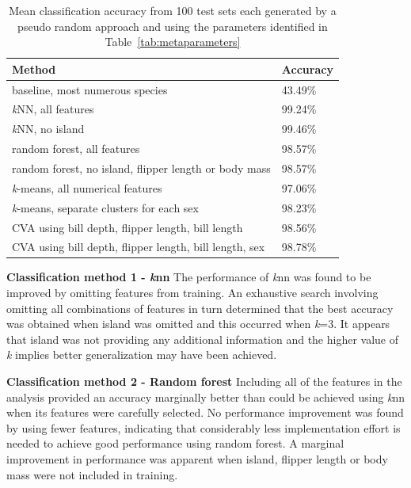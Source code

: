 \documentclass[12pt]{article}
\begin{document}
\begin{table} %
  \small
  \begin{center}
  \vspace{0\baselineskip} %
  \setlength{\abovecaptionskip}{5pt}
  \setlength{\belowcaptionskip}{5pt}
  \fontsize{10}{10}\selectfont %
  \begin{tabular}{l|l}
  Method & Accuracy\\
  \hline
  baseline, most numerous species & 43.49\% \\
  \hline
  \textit{k}NN, all features	& 99.24\% \\
  \textit{k}NN, no island &	99.46\% \\
  \hline
  random forest, all features	& 98.57\% \\
  random forest, no island, flipper length or body mass	& 98.57\% \\
  \hline
  \textit{k}-means, all numerical features & 97.06\% \\
  \textit{k}-means, separate clusters for each sex & 98.23\% \\
  \hline
  CVA using bill depth, flipper length, bill length	& 98.56\% \\
  CVA using bill depth, flipper length, bill length, sex &98.78\% \\
  \hline
  \end{tabular}
  \vspace{-1.5\baselineskip} %
  \end{center} 
  \caption{Mean classification accuracy from 100 test sets each generated by a pseudo random approach 
  and using the parameters identified in Table~\ref{tab:metaparameters}}
  \vspace{-2\baselineskip} %
  \label{tab:results}
\end{table} 

\textbf{Classification method 1 - \textit{k}nn}  
The performance of \textit{k}nn was found to be improved by omitting features from training. 
An exhaustive search involving omitting all combinations of features in turn determined that the best accuracy was obtained 
when island was omitted and this occurred when \textit{k}=3. It appears that island was not providing any additional information 
and the higher value of \textit{k} implies better generalization may have been achieved.

\textbf{Classification method 2 - Random forest}  
Including all of the features in the analysis provided an accuracy marginally better 
than could be achieved using \textit{k}nn when its features were carefully selected. 
No performance improvement was found by using fewer features, indicating that 
considerably less implementation effort is needed to achieve good performance using random forest. 
A marginal improvement in performance was apparent when island, flipper length or body mass were not included in training.
\end{document}

